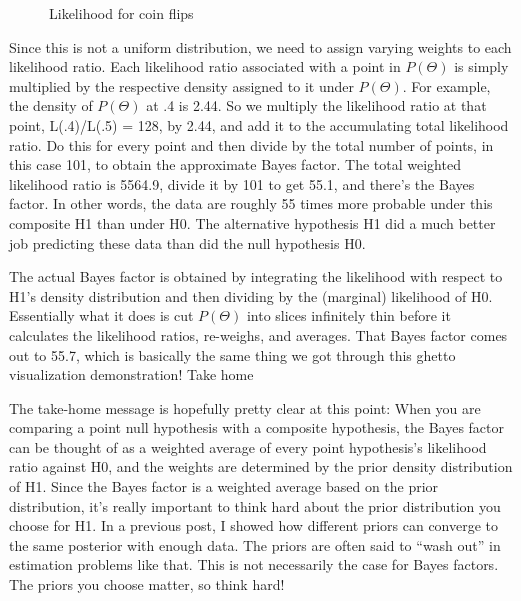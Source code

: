 \begin{figure}[h]
    \centering
    \caption{Likelihood for coin flips}
    \label{fig:p05c03-snip17}
\end{figure}



Since this is not a uniform distribution, we need to assign varying weights to each likelihood ratio. Each likelihood ratio associated with a point in $P(\Theta)$ is simply multiplied by the respective density assigned to it under $P(\Theta)$. For example, the density of $P(\Theta)$ at .4 is 2.44. So we multiply the likelihood ratio at that point, L(.4)/L(.5) = 128, by 2.44, and add it to the accumulating total likelihood ratio. Do this for every point and then divide by the total number of points, in this case 101, to obtain the approximate Bayes factor. The total weighted likelihood ratio is 5564.9, divide it by 101 to get 55.1, and there's the Bayes factor. In other words, the data are roughly 55 times more probable under this composite H1 than under H0. The alternative hypothesis H1 did a much better job predicting these data than did the null hypothesis H0.

The actual Bayes factor is obtained by integrating the likelihood with respect to H1's density distribution and then dividing by the (marginal) likelihood of H0. Essentially what it does is cut $P(\Theta)$ into slices infinitely thin before it calculates the likelihood ratios, re-weighs, and averages. That Bayes factor comes out to 55.7, which is basically the same thing we got through this ghetto visualization demonstration!
Take home

The take-home message is hopefully pretty clear at this point: When you are comparing a point null hypothesis with a composite hypothesis, the Bayes factor can be thought of as a weighted average of every point hypothesis's likelihood ratio against H0, and the weights are determined by the prior density distribution of H1. Since the Bayes factor is a weighted average based on the prior distribution, it's really important to think hard about the prior distribution you choose for H1. In a previous post, I showed how different priors can converge to the same posterior with enough data. The priors are often said to ``wash out'' in estimation problems like that. This is not necessarily the case for Bayes factors. The priors you choose matter, so think hard!


